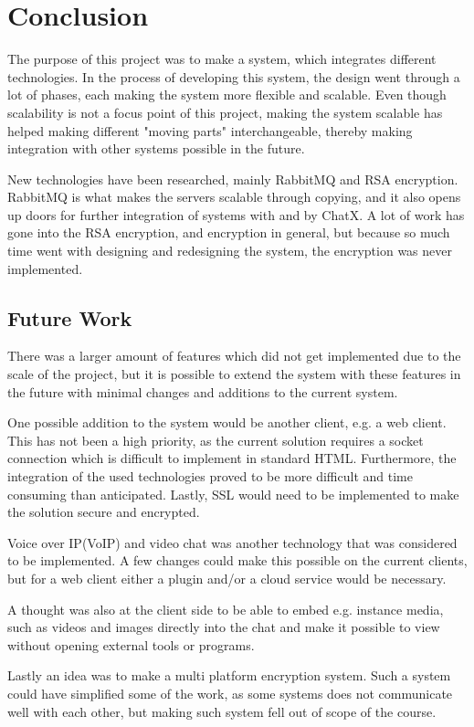 \chapter{Conclusion}

The purpose of this project was to make a system, which integrates different technologies. In the process of developing this system, the design went through a lot of phases, each making the system more flexible and scalable. Even though scalability is not a focus point of this project, making the system scalable has helped making different "moving parts" interchangeable, thereby making integration with other systems possible in the future.  

New technologies have been researched, mainly RabbitMQ and RSA encryption. RabbitMQ is what makes the servers scalable through copying, and it also opens up doors for further integration of systems with and by ChatX. A lot of work has gone into the RSA encryption, and encryption in general, but because so much time went with designing and redesigning the system, the encryption was never implemented. 


\section{Future Work}

There was a larger amount of features which did not get implemented due to the scale of the project, but it is possible to extend the system with these features in the future with minimal changes and additions to the current system.

One possible addition to the system would be another client, e.g. a web client. This has not been a high priority, as the current solution requires a socket connection which is difficult to implement in standard HTML. Furthermore, the integration of the used technologies proved to be more difficult and time consuming than anticipated. Lastly, SSL would need to be implemented to make the solution secure and encrypted.
 
Voice over IP(VoIP) and video chat was another technology that was considered to be implemented. A few changes could make this possible on the current clients, but for a web client either a plugin and/or a cloud service would be necessary. 

A thought was also at the client side to be able to embed e.g. instance media, such as videos and images directly into the chat and make it possible to view without opening external tools or programs.

Lastly an idea was to make a multi platform encryption system. Such a system could have simplified some of the work, as some systems does not communicate well with each other, but making such system fell out of scope of the course.
